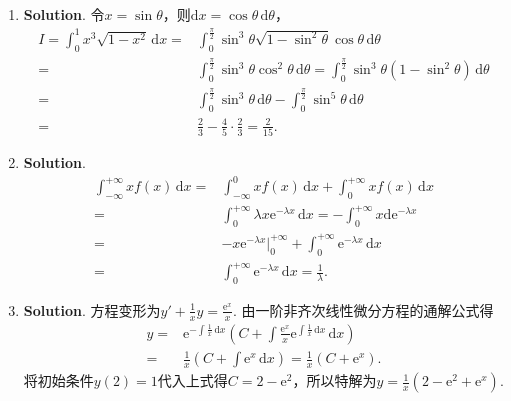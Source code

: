\documentclass[../main.tex]{subfiles}
\begin{document}
\begin{enumerate}
    \item \textbf{Solution}. 令$x=\sin\theta$，则$\mathrm{d}x=\cos\theta\,\mathrm{d}
              \theta$，
          \[
              \begin{aligned}
                  I = \int_{0}^{1}x^{3}\sqrt{1-x^2}\,\mathrm{d}x = {} & \int_{0}^{\frac{\pi}{2}}\sin^{3}\theta\sqrt{1-\sin^2\theta}\cos\theta\,\mathrm{d}\theta                                                             \\
                  = {}                                                & \int_{0}^{\frac{\pi}{2}}\sin^{3}\theta\cos^{2}\theta\,\mathrm{d}\theta = \int_{0}^{\frac{\pi}{2}}\sin^{3}\theta(1-\sin^{2}\theta)\,\mathrm{d}\theta \\
                  = {}                                                & \int_{0}^{\frac{\pi}{2}}\sin^{3}\theta\,\mathrm{d}\theta - \int_{0}^{\frac{\pi}{2}}\sin^{5}\theta\,\mathrm{d}\theta                                 \\
                  = {}                                                & \frac{2}{3}-\frac{4}{5}\cdot\frac{2}{3}= \frac{2}{15}.
              \end{aligned}
          \]

    \item \textbf{Solution}.
          \[
              \begin{aligned}
                  \int_{-\infty}^{+\infty}xf(x)\,\mathrm{d}x = {} & \int_{-\infty}^{0}xf(x)\,\mathrm{d}x+\int_{0}^{+\infty}xf(x)\,\mathrm{d}x                                                \\
                  = {}                                            & \int_{0}^{+\infty}\lambda x \mathrm{e}^{-\lambda x}\,\mathrm{d}x =-\int_{0}^{+\infty}x \mathrm{d}\mathrm{e}^{-\lambda x} \\
                  = {}                                            & -x\mathrm{e}^{-\lambda x}\bigg|_{0}^{+\infty}+\int_{0}^{+\infty}\mathrm{e}^{-\lambda x}\,\mathrm{d}x                     \\
                  = {}                                            & \int_{0}^{+\infty}\mathrm{e}^{-\lambda x}\,\mathrm{d}x = \frac{1}{\lambda}.
              \end{aligned}
          \]

    \item \textbf{Solution}. 方程变形为$y'+\frac{1}{x}y=\frac{\mathrm{e}^{x}}{x}$. 由一阶非齐次线性微分方程的通解公式得
          \[
              \begin{aligned}
                  y = {} & \mathrm{e}^{-\int\frac{1}{x}\,\mathrm{d}x}\left(C+\int \frac{\mathrm{e}^x}{x}\mathrm{e}^{\int\frac{1}{x}\,\mathrm{d}x}\,\mathrm{d}x\right) \\
                  = {}   & \frac{1}{x}\left(C+\int \mathrm{e}^{x}\,\mathrm{d}x\right) = \frac{1}{x}\left(C+\mathrm{e}^{x}\right).
              \end{aligned}
          \]
          将初始条件$y(2)=1$代入上式得$C=2-\mathrm{e}^{2}$，所以特解为$y=\frac{1}{x}\left
              (2-\mathrm{e}^{2}+\mathrm{e}^{x}\right)$.
\end{enumerate}
\end{document}
